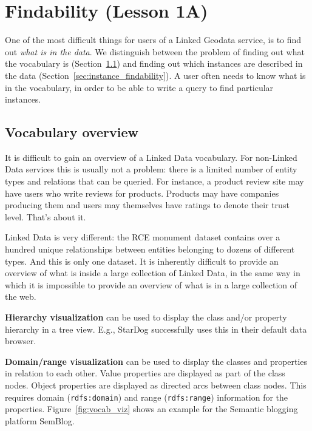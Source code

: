\documentclass[a4paper]{scrartcl}
\newcommand{\textt}[1]{{\small \texttt{#1}}}
\begin{document}
\section{Findability (Lesson 1A)}
\label{sec:findability}

One of the most difficult things for users of a Linked Geodata
service, is to find out \emph{what is in the data}.  We distinguish
between the problem of finding out what the vocabulary is
(Section~\ref{sec:vocabulary_overview}) and finding out which
instances are described in the data
(Section~\ref{sec:instance_findability}).  A user often needs to know
what is in the vocabulary, in order to be able to write a query to
find particular instances.


\subsection{Vocabulary overview}
\label{sec:vocabulary_overview}

It is difficult to gain an overview of a Linked Data vocabulary.  For
non-Linked Data services this is usually not a problem: there is a
limited number of entity types and relations that can be queried.  For
instance, a product review site may have users who write reviews for
products.  Products may have companies producing them and users may
themselves have ratings to denote their trust level.  That's about it.

Linked Data is very different: the RCE monument dataset contains over
a hundred unique relationships between entities belonging to dozens of
different types.  And this is only one dataset.  It is inherently
difficult to provide an overview of what is inside a large collection
of Linked Data, in the same way in which it is impossible to provide
an overview of what is in a large collection of the web.

\textbf{Hierarchy visualization} can be used to display the class
and/or property hierarchy in a tree view.  E.g., StarDog successfully
uses this in their default data browser.

\textbf{Domain/range visualization} can be used to display the classes
and properties in relation to each other.  Value properties are
displayed as part of the class nodes.  Object properties are displayed
as directed arcs between class nodes.  This requires domain
(\textt{rdfs:domain}) and range (\textt{rdfs:range}) information for
the properties.  Figure~\ref{fig:vocab_viz} shows an example for the
Semantic blogging platform SemBlog.
\end{document}
